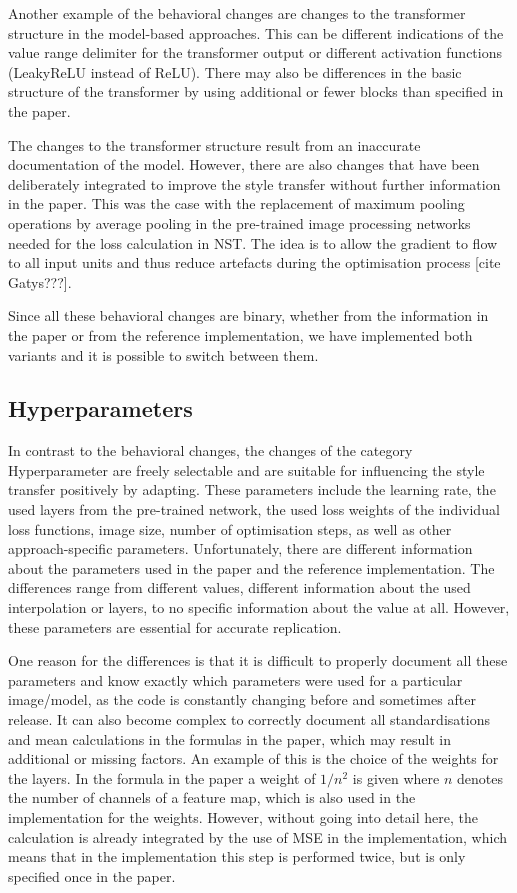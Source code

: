 Another example of the behavioral changes are changes to the transformer structure in the model-based approaches. This can be different indications of the value range delimiter for the transformer output or different activation functions (LeakyReLU instead of ReLU). There may also be differences in the basic structure of the transformer by using additional or fewer blocks than specified in the paper.

The changes to the transformer structure result from an inaccurate documentation of the model. However, there are also changes that have been deliberately integrated to improve the style transfer without further information in the paper. This was the case with the replacement of maximum pooling operations by average pooling in the pre-trained image processing networks needed for the loss calculation in NST. The idea is to allow the gradient to flow to all input units and thus reduce artefacts during the optimisation process [cite Gatys???].

Since all these behavioral changes are binary, whether from the information in the paper or from the reference implementation, we have implemented both variants and it is possible to switch between them.

\subsection{Hyperparameters}

In contrast to the behavioral changes, the changes of the category Hyperparameter are freely selectable and are suitable for influencing the style transfer positively by adapting. These parameters include the learning rate, the used layers from the pre-trained network, the used loss weights of the individual loss functions, image size, number of optimisation steps, as well as other approach-specific parameters. Unfortunately, there are different information about the parameters used in the paper and the reference implementation. The differences range from different values, different information about the used interpolation or layers, to no specific information about the value at all. However, these parameters are essential for accurate replication. 

One reason for the differences is that it is difficult to properly document all these parameters and know exactly which parameters were used for a particular image/model, as the code is constantly changing before and sometimes after release. It can also become complex to correctly document all standardisations and mean calculations in the formulas in the paper, which may result in additional or missing factors. An example of this is the choice of the weights for the layers. In the formula in the paper a weight of $1/n^{2}$ is given where $n$ denotes the number of channels of a feature map, which is also used in the implementation for the weights. However, without going into detail here, the calculation is already integrated by the use of MSE in the implementation, which means that in the implementation this step is performed twice, but is only specified once in the paper.

